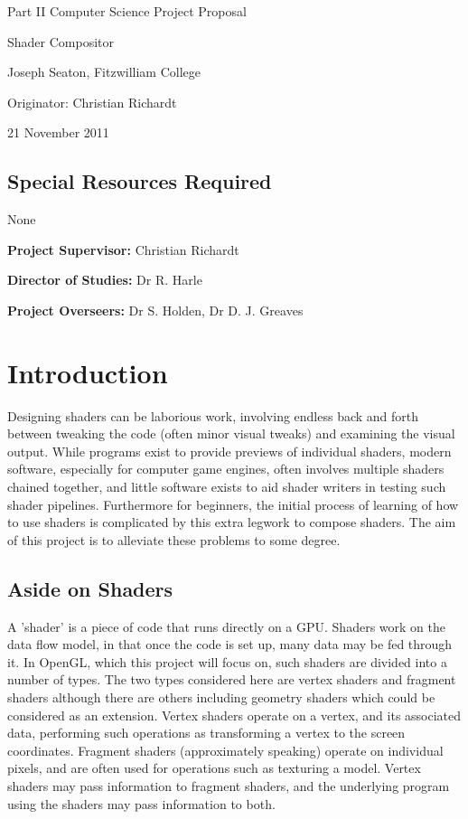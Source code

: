 

\vfil

\centerline{\Large Part II Computer Science Project Proposal}
\vspace{0.4in}
\centerline{\Large Shader Compositor }
\vspace{0.4in}
\centerline{\large Joseph Seaton, Fitzwilliam College}
\vspace{0.3in}
\centerline{\large Originator: Christian Richardt}
\vspace{0.3in}
\centerline{\large 21 November 2011}

\vfil

\subsection*{Special Resources Required}
None
\vspace{0.2in}

\noindent
{\bf Project Supervisor:} Christian Richardt
\vspace{0.2in}

\noindent
{\bf Director of Studies:} Dr R. Harle
\vspace{0.2in}
\noindent
 
\noindent
{\bf Project Overseers:} Dr S. Holden, Dr D. J. Greaves

\vfil
\pagebreak


\section*{Introduction}
Designing shaders can be laborious work, involving endless back and forth between tweaking the
code (often minor visual tweaks) and examining the visual output. While programs exist to provide
previews of individual shaders, modern software, especially for computer game engines, often
involves multiple shaders chained together, and little software exists to aid shader writers in testing
such shader pipelines. Furthermore for beginners, the initial process of learning of how to use
shaders is complicated by this extra legwork to compose shaders. The aim of this project is to
alleviate these problems to some degree.

\subsection*{Aside on Shaders}
A 'shader' is a piece of code that runs directly on a GPU. Shaders work on the data flow model, in
that once the code is set up, many data may be fed through it. In OpenGL, which this project will
focus on, such shaders are divided into a number of types. The two types considered here are vertex
shaders and fragment shaders although there are others including geometry shaders which could be
considered as an extension. Vertex shaders operate on a vertex, and its associated data, performing
such operations as transforming a vertex to the screen coordinates. Fragment shaders
(approximately speaking) operate on individual pixels, and are often used for operations such as
texturing a model. Vertex shaders may pass information to fragment shaders, and the underlying
program using the shaders may pass information to both.

